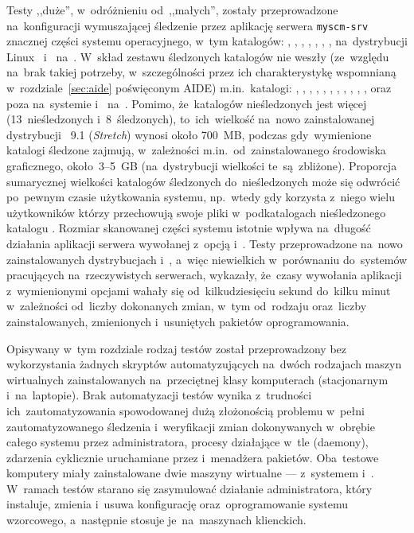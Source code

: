 \documentclass[thesis]{subfiles}
\begin{document}
Testy ,,duże'', w~odróżnieniu od~,,małych'', zostały przeprowadzone na~konfiguracji wymuszającej śledzenie przez aplikację serwera \texttt{myscm-srv} znacznej części systemu operacyjnego, w~tym katalogów: , , , , , , ,  na~dystrybucji Linux~\debian{} i~ na~\linuxarch. W~skład zestawu śledzonych katalogów nie weszły (ze~względu na~brak takiej potrzeby, w~szczególności przez ich charakterystykę wspomnianą w~rozdziale~\ref{sec:aide} poświęconym AIDE) m.in.~katalogi: , , , , , , , , , , ,  oraz~ poza  na~systemie \debian{} i~ na~\linuxarch{}. Pomimo, że~katalogów nieśledzonych jest więcej (13~nieśledzonych i~8~śledzonych), to~ich~wielkość na~nowo zainstalowanej dystrybucji \debian{}~9.1 (\emph{Stretch}) wynosi około 700~MB, podczas gdy~wymienione katalogi śledzone zajmują, w~zależności m.in.~od~zainstalowanego środowiska graficznego, około~3--5~GB (na~dystrybucji \linuxarch{} wielkości te~są~zbliżone). Proporcja sumarycznej wielkości katalogów śledzonych do~nieśledzonych może się odwrócić po~pewnym czasie użytkowania systemu, np.~wtedy gdy korzysta z~niego wielu użytkowników którzy przechowują swoje pliki w~podkatalogach nieśledzonego katalogu . Rozmiar skanowanej części systemu istotnie wpływa na~długość działania aplikacji serwera \texttt{\srvappname{}} wywołanej z~opcją  i~. Testy przeprowadzone na~nowo zainstalowanych dystrybucjach \debian{} i~\arch{}, a~więc niewielkich w~porównaniu do~systemów pracujących na~rzeczywistych serwerach, wykazały, że~czasy wywołania aplikacji z~wymienionymi opcjami wahały się od~kilkudziesięciu sekund do~kilku minut w~zależności od~liczby dokonanych zmian, w~tym od~rodzaju oraz~liczby zainstalowanych, zmienionych i~usuniętych pakietów oprogramowania.

Opisywany w~tym rozdziale rodzaj testów został przeprowadzony bez wykorzystania żadnych skryptów automatyzujących na~dwóch rodzajach maszyn wirtualnych zainstalowanych na~przeciętnej klasy komputerach (stacjonarnym i~na~laptopie). Brak automatyzacji testów wynika z~trudności ich~zautomatyzowania spowodowanej dużą złożonością problemu w~pełni zautomatyzowanego śledzenia i~weryfikacji zmian dokonywanych w~obrębie całego systemu przez administratora, procesy działające w~tle (daemony), zdarzenia cyklicznie uruchamiane przez  i~menadżera pakietów. Oba~testowe komputery miały zainstalowane dwie maszyny wirtualne --- z~systemem \debian{} i~\linuxarch{}. W~ramach testów starano się zasymulować działanie administratora, który instaluje, zmienia i~usuwa konfigurację oraz~oprogramowanie systemu wzorcowego, a~następnie stosuje je~na~maszynach klienckich.
\end{document}
